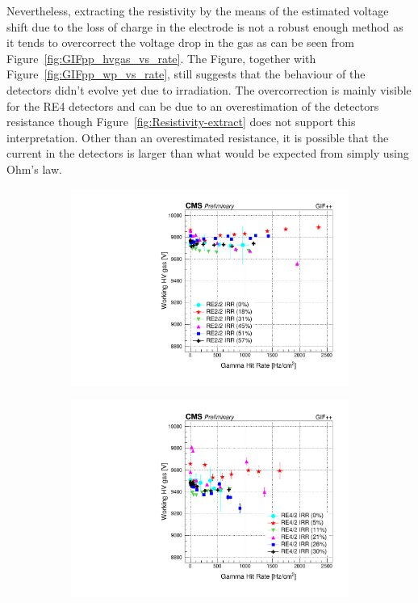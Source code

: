 	Nevertheless, extracting the resistivity by the means of the estimated voltage shift due to the loss of charge in the electrode is not a robust enough method as it tends to overcorrect the voltage drop in the gas as can be seen from Figure~\ref{fig:GIFpp_hvgas_vs_rate}. The Figure, together with Figure~\ref{fig:GIFpp_wp_vs_rate}, still suggests that the behaviour of the detectors didn't evolve yet due to irradiation. The overcorrection is mainly visible for the RE4 detectors and can be due to an overestimation of the detectors resistance though Figure~\ref{fig:Resistivity-extract} does not support this interpretation. Other than an overestimated resistance, it is possible that the current in the detectors is larger than what would be expected from simply using Ohm's law.
	
	\begin{figure}[H]
    	\begin{subfigure}{0.5\linewidth}
			\centering
    		\includegraphics[width = \linewidth]{fig/chapt5/RE2-2_IRR_HVgas_vs_Rate.pdf}
        	\caption{\label{fig:GIFpp_hvgas_vs_rate:A}}
    	\end{subfigure}
    	\begin{subfigure}{0.5\linewidth}
			\centering
    		\includegraphics[width = \linewidth]{fig/chapt5/RE4-2_IRR_HVgas_vs_Rate.pdf}

\end{subfigure}
\end{figure}
